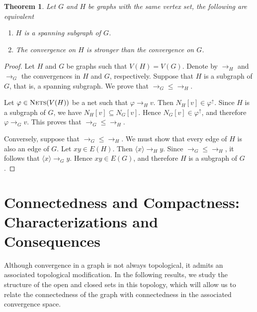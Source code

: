 \documentclass{amsart}
\newtheorem{theorem}{Theorem}[section]
\theoremstyle{definition}
\theoremstyle{remark}
\numberwithin{equation}{section}
\begin{document}
\begin{theorem}
	Let $G$ and $H$ be graphs with the same vertex set, the following are equivalent
	
	\begin{enumerate}
		\item $H$ is a spanning subgraph of $G$.
		\item The convergence on $H$ is stronger than the convergence on $G$.
	\end{enumerate}
\end{theorem}
\begin{proof}
Let $H$ and $G$ be graphs such that $V(H)=V(G)$. Denote by $\to_H$ and $\to_G$ the convergences in $H$ and $G$, respectively. Suppose that $H$ is a subgraph of $G$, that is, a spanning subgraph. We prove that $\to_G \leq \to_H$.

Let $\varphi \in \textsc{Nets}(V(H))$ be a net such that $\varphi \to_H v$. Then $N_H[v] \in \varphi^{\uparrow}$. Since $H$ is a subgraph of $G$, we have $N_H[v] \subseteq N_G[v]$. Hence $N_G[v] \in \varphi^{\uparrow}$, and therefore $\varphi \to_G v$. This proves that $\to_G \leq \to_H$.

Conversely, suppose that $\to_G \leq \to_H$. We must show that every edge of $H$ is also an edge of $G$. Let $xy \in E(H)$. Then $\langle x \rangle \to_H y$. Since $\to_G \leq \to_H$, it follows that $\langle x \rangle \to_G y$. Hence $xy \in E(G)$, and therefore $H$ is a subgraph of $G$.
\end{proof}

\section{Connectedness and Compactness: Characterizations and Consequences}



Although convergence in a graph is not always topological, it admits an associated topological modification. In the following results, we study the structure of the open and closed sets in this topology, which will allow us to relate the connectedness of the graph with connectedness in the associated convergence space.
\end{document}
